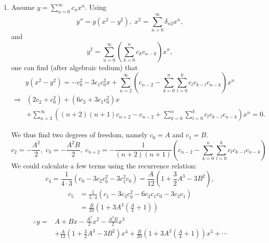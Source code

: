 \item
\begin{enumerate}[wide, labelindent=0pt, label= (\alph*)]
	\item
	      Assume $y = \sum_{n=0}^\infty c_n x^n$.
	      Using
	      \[
		      y'' = y \left( x^2 - y^2 \right),\; x^2 = \sum_{n=0}^\infty \delta_{n2} x^n,
	      \]
	      and
	      \[
		      y^2 = \sum_{n=0}^\infty \left( \sum_{k=0}^n c_k c_{n - k} \right) x^n,
	      \]
	      one can find (after algebraic tedium) that
	      \[
		      y \left( x^2 - y^2 \right)
		      = -c_0^2 - 3c_1 c_0^2 x + \sum_{n=2}^\infty \left(
		      c_{n - 2} - \sum_{k=0}^n \sum_{l=0}^k c_l c_{k - l} c_{n - k}
		      \right) x^n
	      \]
	      \begin{align*}
		      \Rightarrow
		       & \left( 2c_2 + c_0^2 \right)
		      + \left( 6c_3 + 3c_1 c_0^2 \right) x \\
		       & + \sum_{n=2}^\infty \left(
		      (n + 2)(n + 1) c_{n + 2} - c_{n - 2}
		      + \sum_{k=0}^n \sum_{l=0}^k c_l c_{k - l} c_{n - k}
		      \right) x^n = 0.
	      \end{align*}

	      We thus find two degrees of freedom, namely $c_0 = A$ and $c_1 = B$.
	      \[
		      c_2 = -\frac{A^2}{2},\;
		      c_3 = -\frac{A^2 B}{2},\;
		      c_{n + 2} = -\frac{1}{(n + 2)(n + 1)} \left(
		      c_{n - 2} - \sum_{k=0}^n \sum_{l = 0}^k c_l c_{k - l} c_{n - k}
		      \right)
	      \]
	      We could calculate a few terms using the recurrence relation:
	      \[
		      c_4
		      = \frac{1}{4 \cdot 3} \left(
		      c_0 - 3c_2 c_0^2 - 3c_1^2 c_0
		      \right)
		      = \frac{A}{12} \left(
		      1 + \frac{3}{2}A^3 - 3B^2
		      \right),
	      \]
	      \begin{align*}
		      c_5
		       & = \frac{1}{5 \cdot 4} \left(
		      c_1 - 3c_3 c_0^2 - 6c_2 c_1 c_0 - 3c_2 c_1
		      \right)                         \\
		       & = \frac{B}{20} \left(
		      1 + 3A^3 \left( \frac{A}{4} + 1 \right)
		      \right)
	      \end{align*}
	      \begin{align*}
		      \therefore
		      y
		      = & A + Bx
		      - \frac{A^2}{2}x^2
		      - \frac{A^2 B}{2}x^3      \\
		        & + \frac{A}{12} \left(
		      1 + \frac{3}{2}A^3 - 3B^2
		      \right) x^4
		      + \frac{B}{20} \left(
		      1 + 3A^3 \left( \frac{A}{4} + 1 \right)
		      \right) x^5
		      + \cdots
	      \end{align*}


\end{enumerate}
